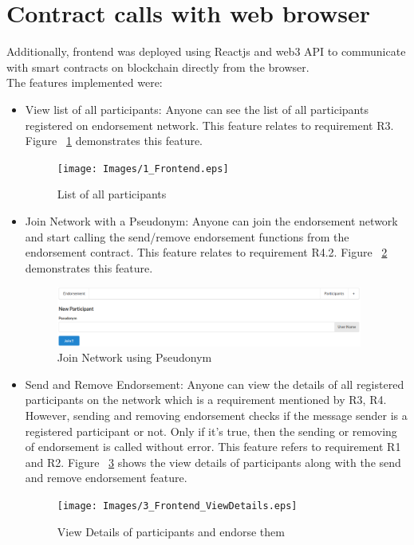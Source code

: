 \section{Contract calls with web browser}
Additionally, frontend was deployed using Reactjs and web3 API to communicate
with smart contracts on blockchain directly from the browser. \\
The features implemented were: \\
\begin{itemize}
	\item View list of all participants: Anyone can see the list of all
	participants registered on endorsement network. This feature relates to
	requirement R3. Figure ~\ref{listall} demonstrates this feature.   
	\begin{figure}[h]
		\texttt{[image: Images/1\_Frontend.eps]} 
		\caption{List of all participants} 
		\label{listall}
	\end{figure}
	\item Join Network with a Pseudonym: Anyone can join the endorsement
	network and start calling the send/remove endorsement functions from the
	endorsement contract. This feature relates to requirement R4.2. Figure ~\ref{joinNetwork} demonstrates this feature. 
	\begin{figure}[h]
		\includegraphics[width=0.95\textwidth]{Images/2_Frontend_JoinNetwork.eps} 
		\caption{Join Network using Pseudonym} 
		\label{joinNetwork}
	\end{figure}
	\item Send and Remove Endorsement: Anyone can view the details of all
		registered participants on the network which is a requirement mentioned
		by R3, R4. However, sending and removing endorsement checks if the
		message sender is a registered participant or not. Only if it's true,
		then the sending or removing of endorsement is called without error.
		This feature refers to requirement R1 and R2. Figure ~\ref{viewDetails}
		shows the view details of participants along with the send and remove
		endorsement feature.
		\begin{figure}[h]
			\texttt{[image: Images/3\_Frontend\_ViewDetails.eps]} 
			\caption{View Details of participants and endorse them} 
			\label{viewDetails}
	\end{figure}
\end{itemize}

